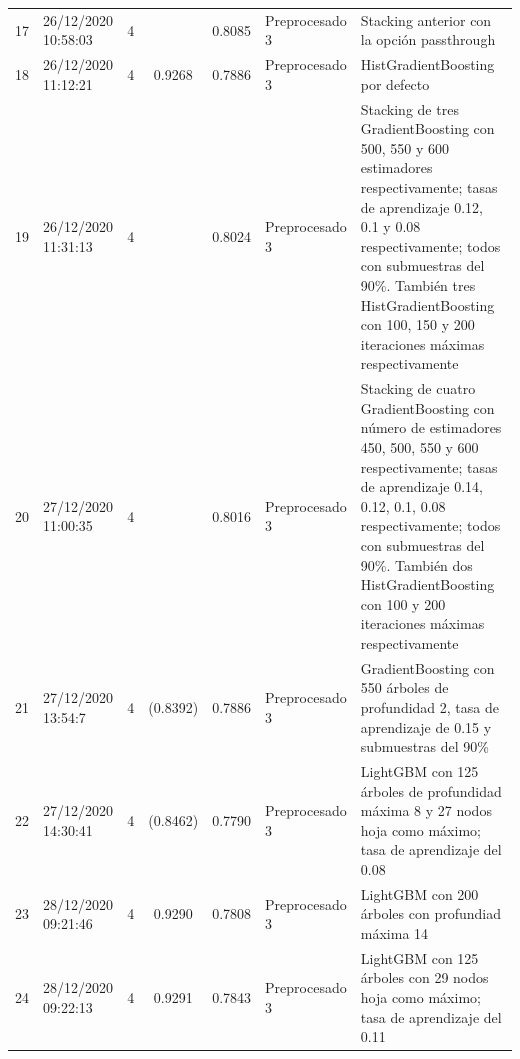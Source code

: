 \documentclass{article}
\begin{document}
\begin{longtable}{|c|C{2.1cm}|c|c|c|C{4cm}|C{6cm}|}
\midrule

17 & 26/12/2020 10:58:03 & 4 &  & 0.8085 & Preprocesado 3 & Stacking anterior con la opción passthrough \\

\midrule

18 & 26/12/2020 11:12:21 & 4 & 0.9268  & 0.7886 & Preprocesado 3 & HistGradientBoosting por defecto \\

\midrule

19 & 26/12/2020 11:31:13 & 4 & & 0.8024 & Preprocesado 3 & Stacking de tres
GradientBoosting con 500, 550 y 600 estimadores respectivamente; tasas
de aprendizaje 0.12, 0.1 y 0.08 respectivamente; todos con submuestras
del 90\%. También tres HistGradientBoosting con 100, 150 y 200 iteraciones máximas respectivamente \\

\midrule

20 & 27/12/2020 11:00:35 & 4 &  & 0.8016 & Preprocesado 3 & Stacking de cuatro GradientBoosting con número de estimadores 450, 500, 550 y 600 respectivamente; tasas de aprendizaje 0.14, 0.12, 0.1, 0.08 respectivamente; todos con submuestras del 90\%. También dos HistGradientBoosting con 100 y 200 iteraciones máximas respectivamente \\

\midrule

21 & 27/12/2020 13:54:7 & 4 & (0.8392) & 0.7886 & Preprocesado 3 & GradientBoosting con 550 árboles de profundidad 2, tasa de aprendizaje de 0.15 y submuestras del 90\% \\

\midrule

22 & 27/12/2020 14:30:41 & 4 & (0.8462) & 0.7790 & Preprocesado 3 & LightGBM con 125 árboles de profundidad máxima 8 y 27 nodos hoja como máximo; tasa de aprendizaje del 0.08 \\

\midrule

23 & 28/12/2020 09:21:46 & 4 & 0.9290 & 0.7808 & Preprocesado 3 & LightGBM con 200 árboles con profundiad máxima 14 \\

\midrule

24 & 28/12/2020 09:22:13 & 4 & 0.9291 & 0.7843 & Preprocesado 3 & LightGBM con 125 árboles con 29 nodos hoja como máximo; tasa de aprendizaje del 0.11 \\


\end{longtable}
\end{document}
